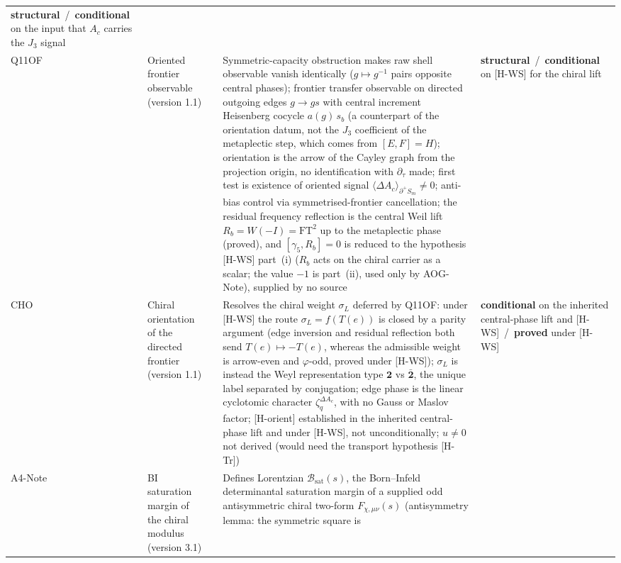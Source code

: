 \documentclass[11pt,a4paper]{article}
\newcommand{\sproved}{\textcolor{cproved}{\textbf{proved}}}
\newcommand{\sstruct}{\textcolor{cstruct}{\textbf{structural}}}
\newcommand{\scond}{\textcolor{ccond}{\textbf{conditional}}}
\begin{document}
\begin{longtable}{@{}p{1.70cm}p{2.9cm}p{1.3cm}p{6.25cm}>{\raggedright\arraybackslash}p{2.0cm}@{}}
      \sstruct\ /\ \scond{} on the input that $A_c$ carries the $J_3$ signal \\[3pt]
      Q11OF & Oriented frontier observable (version 1.1) & \cite{Beau2026q11of} &
      Symmetric-capacity obstruction makes raw shell observable vanish identically
      ($g \mapsto g^{-1}$ pairs opposite central phases);
      frontier transfer observable on directed outgoing edges $g \to gs$ with central increment
      Heisenberg cocycle $a(g)\,s_b$ (a counterpart of the orientation datum, not the $J_3$ coefficient of the
      metaplectic step, which comes from $[E,F]=H$);
      orientation is the arrow of the Cayley graph from the projection origin, no identification with
      $\partial_\tau$ made;
      first test is existence of oriented signal $\langle\Delta A_c\rangle_{\partial^+ S_m} \neq 0$;
      anti-bias control via symmetrised-frontier cancellation; the residual frequency reflection is the central Weil
      lift $R_b = W(-I) = \mathrm{FT}^2$ up to the metaplectic phase (proved), and $[\gamma_5, R_b] = 0$ is reduced to
      the hypothesis [H-WS] part~(i) ($R_b$ acts on the chiral carrier as a scalar; the value $-1$ is part~(ii), used only by AOG-Note), supplied by no source &
      \sstruct\ /\ \scond{} on [H-WS] for the chiral lift \\[3pt]
      CHO & Chiral orientation of the directed frontier (version 1.1) & \cite{Beau2026cho} &
      Resolves the chiral weight $\sigma_L$ deferred by Q11OF: under [H-WS] the route $\sigma_L = f(T(e))$ is closed
      by a parity argument (edge inversion and residual reflection both send $T(e)\mapsto-T(e)$,
      whereas the admissible weight is arrow-even and $\varphi$-odd, proved under [H-WS]);
      $\sigma_L$ is instead the Weyl representation type $\mathbf{2}$ vs $\bar{\mathbf{2}}$, the unique
      label separated by conjugation; edge phase is the linear cyclotomic character
      $\zeta_q^{\Delta A_c}$, with no Gauss or Maslov factor; [H-orient] established in the inherited central-phase
      lift and under [H-WS], not unconditionally; $u \neq 0$ not derived (would need the transport hypothesis [H-Tr]) &
      \scond{} on the inherited central-phase lift and [H-WS]\ /\ \sproved{} under [H-WS] \\[3pt]
      A4-Note & BI saturation margin of the chiral modulus (version 3.1) & \cite{Beau2026bim} &
      Defines Lorentzian $\mathcal{B}_{\mathrm{sat}}(s)$, the Born--Infeld determinantal saturation margin of a
      supplied odd antisymmetric chiral two-form $F_{\chi,\mu\nu}(s)$ (antisymmetry lemma: the symmetric square is

\end{longtable}
\end{document}
